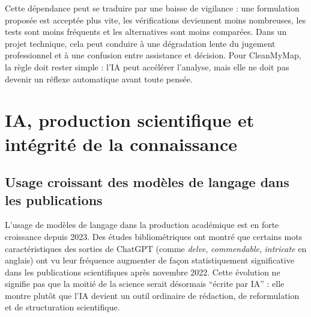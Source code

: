\documentclass[
  10pt,
  a4paper,
  DIV=11,
  numbers=noendperiod,
  oneside]{scrreprt}
\let\oldemph\emph
\renewcommand{\emph}[1]{\oldemph{\textcolor{cmmgray}{#1}}}
\begin{document}
Cette dépendance peut se traduire par une baisse de vigilance : une
formulation proposée est acceptée plus vite, les vérifications
deviennent moins nombreuses, les tests sont moins fréquents et les
alternatives sont moins comparées. Dans un projet technique, cela peut
conduire à une dégradation lente du jugement professionnel et à une
confusion entre assistance et décision. Pour CleanMyMap, la règle doit
rester simple : l'IA peut accélérer l'analyse, mais elle ne doit pas
devenir un réflexe automatique avant toute pensée.

\section{IA, production scientifique et intégrité de la
connaissance}\label{ia-production-scientifique-et-intuxe9grituxe9-de-la-connaissance}

\subsection{Usage croissant des modèles de langage dans les
publications}\label{usage-croissant-des-moduxe8les-de-langage-dans-les-publications}

L'usage de modèles de langage dans la production académique est en forte
croissance depuis 2023. Des études bibliométriques ont montré que
certains mots caractéristiques des sorties de ChatGPT (comme
\emph{delve}, \emph{commendable}, \emph{intricate} en anglais) ont vu
leur fréquence augmenter de façon statistiquement significative dans les
publications scientifiques après novembre 2022. Cette évolution ne
signifie pas que la moitié de la science serait désormais ``écrite par
IA'' : elle montre plutôt que l'IA devient un outil ordinaire de
rédaction, de reformulation et de structuration scientifique.
\end{document}
